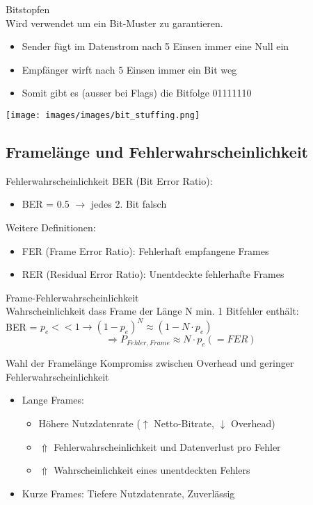 \begin{concept}{Bitstopfen}\\
    Wird verwendet um ein Bit-Muster zu garantieren.
    \begin{itemize}
        \item Sender fügt im Datenstrom nach 5 Einsen immer eine Null ein
        \item Empfänger wirft nach 5 Einsen immer ein Bit weg
        \item Somit gibt es (ausser bei Flags) die Bitfolge 01111110
    \end{itemize}
        \texttt{[image: images/images/bit\_stuffing.png]}
\end{concept}

\subsection{Framelänge und Fehlerwahrscheinlichkeit}

\begin{definition}{Fehlerwahrscheinlichkeit}
    BER (Bit Error Ratio):
    \begin{itemize}
        \item BER = 0.5 $\rightarrow$ jedes 2. Bit falsch
    \end{itemize}
    Weitere Definitionen:
    \begin{itemize}
        \item FER (Frame Error Ratio): Fehlerhaft empfangene Frames
        \item RER (Residual Error Ratio): Unentdeckte fehlerhafte Frames
    \end{itemize}
\end{definition}

\begin{KR}{Frame-Fehlerwahrscheinlichkeit}\\
    Wahrscheinlichkeit dass Frame der Länge N min. 1 Bitfehler enthält:\\
    BER = $p_e << 1 \longrightarrow (1 - p_e)^N \approx (1 - N \cdot p_e)$
    $$ \Rightarrow P_{Fehler, Frame} \approx N \cdot p_e (=FER)$$
\end{KR}

\begin{theorem}{Wahl der Framelänge} Kompromiss zwischen Overhead und geringer Fehlerwahrscheinlichkeit
    \begin{itemize}
    \item Lange Frames:
    \begin{itemize}
        \item Höhere Nutzdatenrate ($\uparrow$ Netto-Bitrate, $\downarrow$ Overhead)
        \item $\Uparrow$ Fehlerwahrscheinlichkeit und Datenverlust pro Fehler 
        \item $\Uparrow$ Wahrscheinlichkeit eines unentdeckten Fehlers
    \end{itemize}
    \item Kurze Frames: Tiefere Nutzdatenrate, Zuverlässig
    \end{itemize}
\end{theorem}



